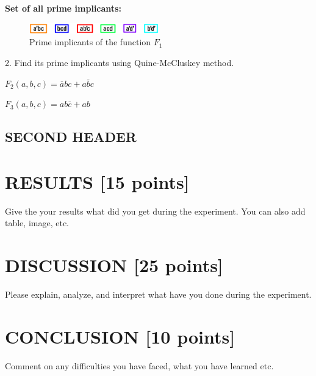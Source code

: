 \documentclass[pdftex,12pt,a4paper]{article}
\begin{document}
\textbf{Set of all prime implicants:}\\

\begin{figure}[H]
    \centering
        \includegraphics[width=0.5\textwidth]{primeimplicants.png}	
        \caption{Prime implicants of the function  $F_1$}
        \label{fig1}
\end{figure}

\begin{enumerate}
    2. Find its prime implicants using Quine-McCluskey method.
\end{enumerate}

$F_2 (a, b, c) = \overline{a}bc + a\overline{b}c$

$F_3 (a, b, c) = ab\overline{c} + ab$
	


\subsection{SECOND HEADER}


\section{RESULTS [15 points]}
Give the your results what did you get during the experiment. You can also add table, image, etc. 

\section{DISCUSSION [25 points]}
Please explain, analyze, and interpret what have you done during the  experiment. 

\section{CONCLUSION [10 points]}
Comment on any difficulties you have faced, what you have learned etc.

\newpage
{}



\end{document}
